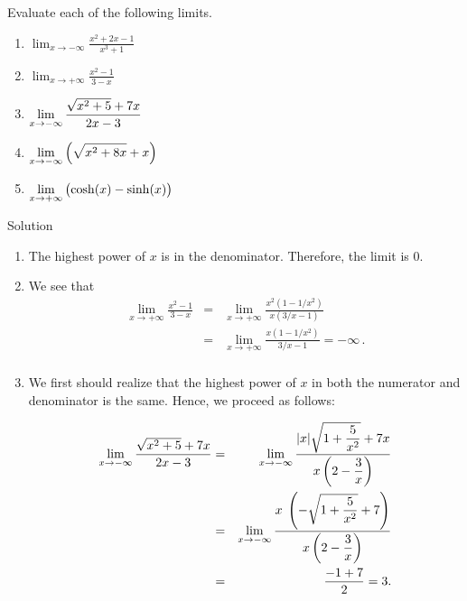 \begin{example}\label{ex_hzasy3}
Evaluate each of the following limits.

\begin{multicols}{2}
\begin{enumerate}
\item		$\displaystyle\lim_{x\rightarrow-\infty}\frac{x^2+2x-1}{x^3+1}$
\item		$\displaystyle\lim_{x\rightarrow+\infty}\frac{x^2-1}{3-x}$
\item $\displaystyle\lim_{x\rightarrow -\infty}\dfrac{\sqrt{x^2+5}+7x}{2x-3}$
\item $\displaystyle\lim_{x\rightarrow -\infty}\left( \sqrt{x^2+8x}+x\right)$
\ifcourse \ifanalysis \item $\displaystyle\lim_{x\rightarrow +\infty}\left( \cosh(x)-\sinh(x)\right)$\fi \fi
\end{enumerate}
\end{multicols}

Solution 

	\begin{enumerate}
	\item		The highest power of $x$ is in the denominator.  Therefore, the limit is 0.	
	\item		We see that
	\begin{eqnarray*}
	\displaystyle\lim_{x\rightarrow+\infty}\frac{x^2-1}{3-x}&=&\displaystyle\lim_{x\rightarrow+\infty}\frac{x^2\left(1-1/x^2\right)}{x\left(3/x-1\right)}\\
	&=&\displaystyle\lim_{x\rightarrow+\infty}\frac{x\left(1-1/x^2\right)}{3/x-1}=-\infty\,.\\
	\end{eqnarray*}
	\item We first should realize that the highest power of $x$ in both the numerator and denominator is the same.  Hence, we proceed as follows:
	
	\begin{eqnarray*}
	\displaystyle\lim_{x\rightarrow -\infty}\dfrac{\sqrt{x^2+5}+7x}{2x-3}&=&
	\displaystyle\lim_{x\rightarrow -\infty}\dfrac{  |x| \sqrt{1+\dfrac{5}{x^2}}+7x }{x\left(2-\dfrac{3}{x}\right)}\\
&=&\displaystyle\lim_{x\rightarrow -\infty}\dfrac{  x \; \left(- \sqrt{1+\dfrac{5}{x^2}}+7\right) }{x\left(2-\dfrac{3}{x}\right)}\\
&=&\dfrac{-1+7}{2}=3.
\end{eqnarray*}


\end{enumerate}
\end{example}
